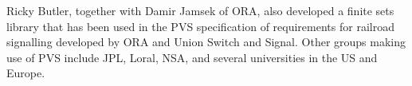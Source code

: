 Ricky Butler, together with Damir Jamsek of ORA, also developed a
finite sets library that has been used in the PVS specification of
requirements for railroad signalling developed by ORA and Union Switch
and Signal.  Other groups making use of PVS include JPL, Loral, NSA,
and several universities in the US and Europe.




